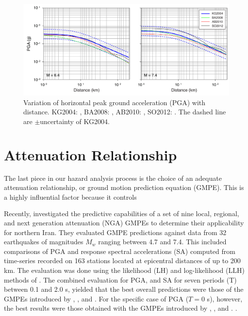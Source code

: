 
\begin{figure}[t]
    \centering
    \includegraphics[width=\textwidth]{figures/pdf/figure-08}
    \caption{Variation of horizontal peak ground acceleration (PGA) with distance. KG2004: \citet{Kalkan2004}, BA2008: \citet{Boore2008}, AB2010: \citet{Akkar2010}, SO2012: \citet{Soghrat2012}. The dashed line are $\pm$uncertainty of KG2004.}
    \label{fig:att}
\end{figure}

\section{Attenuation Relationship}

The last piece in our hazard analysis process is the choice of an adequate attenuation relationship, or ground motion prediction equation (GMPE). This is a highly influential factor because it controls 

Recently, \citet{Zafarani2014} investigated the predictive capabilities of a set of nine local, regional, and next generation attenuation (NGA) GMPEs to determine their applicability for northern Iran. They evaluated GMPE predictions against data from 32 earthquakes of magnitudes $M_w$ ranging between 4.7 and 7.4. This included comparisons of PGA and response spectral accelerations (SA) computed from time-series recorded on 163 stations located at epicentral distances of up to 200 km. The evaluation was done using the likelihood (LH) and log-likelihood (LLH) methods of \citet{Scherbaum_2004_BSSA, Scherbaum_2009_BSSA}. The combined evaluation for PGA, and SA for seven periods (T) between 0.1 and 2.0 s, yielded that the best overall predictions were those of the GMPEs introduced by \citet{Ghasemi_2009_JS}, \citet{Abrahamson_2008_ES}, and \citet{Chiou2008}. For the specific case of PGA ($T = 0$ s), however, the best results were those obtained with the GMPEs introduced by \citet{Kalkan2004}, \citet{Chiou2008}, and \citet{Boore2008}. .

